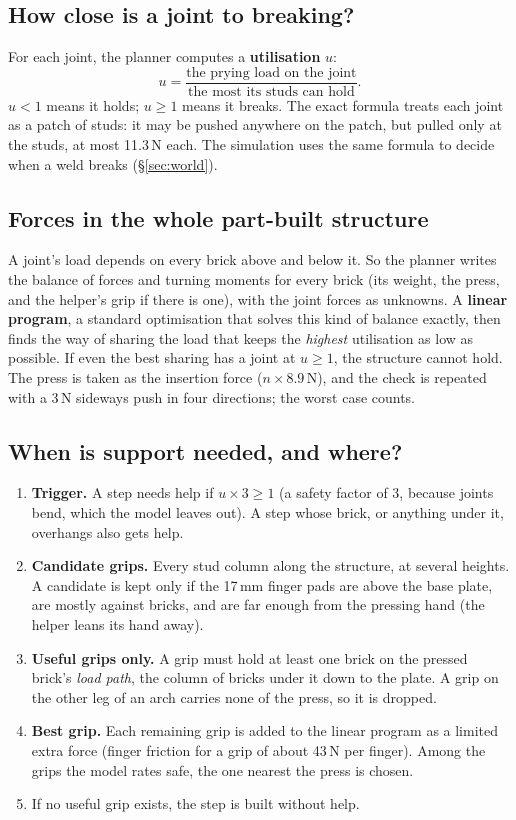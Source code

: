 \documentclass[11pt,a4paper]{article}
\begin{document}
\subsection{How close is a joint to breaking?}
For each joint, the planner computes a \textbf{utilisation} $u$:
\[
u = \frac{\text{the prying load on the joint}}{\text{the most its studs can hold}}.
\]
$u<1$ means it holds; $u\ge1$ means it breaks. The exact formula treats each
joint as a patch of studs: it may be pushed anywhere on the patch, but pulled
only at the studs, at most 11.3\,N each. The simulation uses the same formula to
decide when a weld breaks (\S\ref{sec:world}).

\subsection{Forces in the whole part-built structure}
A joint's load depends on every brick above and below it. So the planner writes
the balance of forces and turning moments for every brick (its weight, the
press, and the helper's grip if there is one), with the joint forces as
unknowns. A \textbf{linear program}, a standard optimisation that solves this
kind of balance exactly, then finds the way of sharing the load that keeps the
\emph{highest} utilisation as low as possible. If even the best sharing has a
joint at $u\ge1$, the structure cannot hold. The press is taken as the
insertion force ($n\times8.9$\,N), and the check is repeated with a 3\,N sideways
push in four directions; the worst case counts.

\subsection{When is support needed, and where?}
\begin{enumerate}
\item \textbf{Trigger.} A step needs help if $u\times3\ge1$ (a safety factor of 3,
      because joints bend, which the model leaves out). A step whose brick, or anything
      under it, overhangs also gets help.
\item \textbf{Candidate grips.} Every stud column along the structure, at several
      heights. A candidate is kept only if the 17\,mm finger pads are above the base
      plate, are mostly against bricks, and are far enough from the pressing hand
      (the helper leans its hand away).
\item \textbf{Useful grips only.} A grip must hold at least one brick on the pressed
      brick's \emph{load path}, the column of bricks under it down to the plate. A
      grip on the other leg of an arch carries none of the press, so it is dropped.
\item \textbf{Best grip.} Each remaining grip is added to the linear program as a
      limited extra force (finger friction for a grip of about 43\,N per finger). Among
      the grips the model rates safe, the one nearest the press is chosen.
\item If no useful grip exists, the step is built without help.
\end{enumerate}
\end{document}
